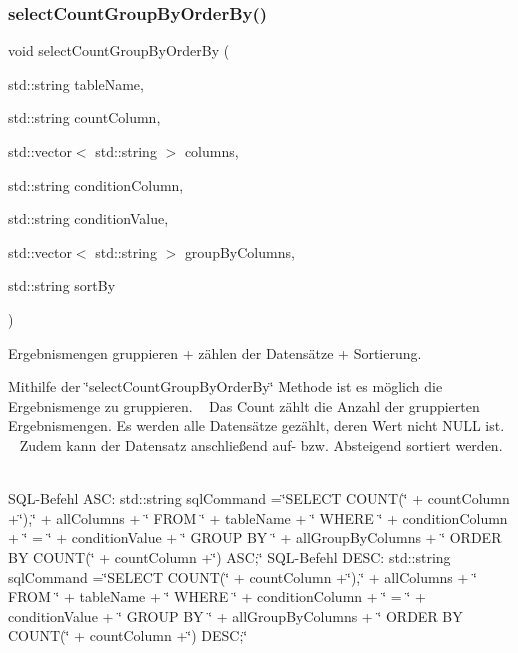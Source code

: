 \subsubsection{select\+Count\+Group\+By\+Order\+By()}
{\footnotesize\ttfamily void select\+Count\+Group\+By\+Order\+By (\begin{DoxyParamCaption}\item[{std\+::string}]{table\+Name,  }\item[{std\+::string}]{count\+Column,  }\item[{std\+::vector$<$ std\+::string $>$}]{columns,  }\item[{std\+::string}]{condition\+Column,  }\item[{std\+::string}]{condition\+Value,  }\item[{std\+::vector$<$ std\+::string $>$}]{group\+By\+Columns,  }\item[{std\+::string}]{sort\+By }\end{DoxyParamCaption})}



Ergebnismengen gruppieren + zählen der Datensätze + Sortierung. 

Mithilfe der \char`\"{}select\+Count\+Group\+By\+Order\+By\char`\"{} Methode ist es möglich die Ergebnismenge zu gruppieren. ~\newline
 Das Count zählt die Anzahl der gruppierten Ergebnismengen. Es werden alle Datensätze gezählt, deren Wert nicht N\+U\+LL ist. ~\newline
 Zudem kann der Datensatz anschließend auf-\/ bzw. Absteigend sortiert werden. ~\newline


S\+Q\+L-\/\+Befehl A\+SC\+: std\+::string sql\+Command =\char`\"{}\+S\+E\+L\+E\+C\+T C\+O\+U\+N\+T(\char`\"{} + count\+Column +\char`\"{}),\char`\"{} + all\+Columns + \char`\"{} F\+R\+O\+M \char`\"{} + table\+Name + \char`\"{} W\+H\+E\+R\+E \char`\"{} + condition\+Column + \char`\"{} = \textquotesingle{}\char`\"{} + condition\+Value + \char`\"{}\textquotesingle{} G\+R\+O\+U\+P B\+Y \char`\"{} + all\+Group\+By\+Columns + \char`\"{} O\+R\+D\+E\+R B\+Y C\+O\+U\+N\+T(\char`\"{} + count\+Column +\char`\"{}) A\+S\+C;\char`\"{} S\+Q\+L-\/\+Befehl D\+E\+SC\+: std\+::string sql\+Command =\char`\"{}\+S\+E\+L\+E\+C\+T C\+O\+U\+N\+T(\char`\"{} + count\+Column +\char`\"{}),\char`\"{} + all\+Columns + \char`\"{} F\+R\+O\+M \char`\"{} + table\+Name + \char`\"{} W\+H\+E\+R\+E \char`\"{} + condition\+Column + \char`\"{} = \textquotesingle{}\char`\"{} + condition\+Value + \char`\"{}\textquotesingle{} G\+R\+O\+U\+P B\+Y \char`\"{} + all\+Group\+By\+Columns + \char`\"{} O\+R\+D\+E\+R B\+Y C\+O\+U\+N\+T(\char`\"{} + count\+Column +\char`\"{}) D\+E\+S\+C;\char`\"{}


